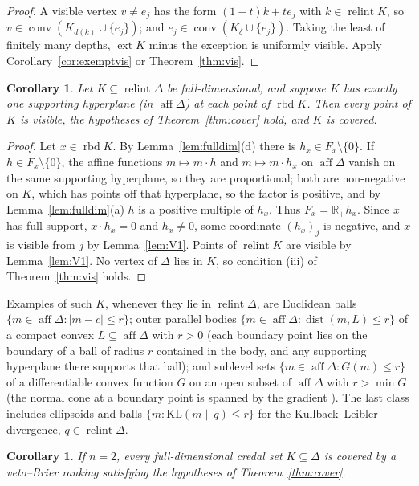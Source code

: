 \documentclass[11pt]{article}
\newcommand{\R}{\mathbb{R}}
\DeclareMathOperator{\conv}{conv}
\DeclareMathOperator{\relint}{relint}
\DeclareMathOperator{\rbd}{rbd}
\DeclareMathOperator{\aff}{aff}
\DeclareMathOperator{\ext}{ext}
\theoremstyle{plain}
\newtheorem{corollary}[theorem]{Corollary}
\theoremstyle{definition}
\theoremstyle{remark}
\begin{document}
\begin{proof}
A visible vertex $v\neq e_j$ has the form $(1-t)k+te_j$ with $k\in\relint K$, so
$v\in\conv(K_{d(k)}\cup\{e_j\})$; and $e_j\in\conv(K_\delta\cup\{e_j\})$. Taking the least
of finitely many depths, $\ext K$ minus the exception is uniformly visible. Apply
Corollary~\ref{cor:exemptvis} or Theorem~\ref{thm:vis}.
\end{proof}

\begin{corollary}\label{cor:smooth}
Let $K\subseteq\relint\Delta$ be full-dimensional, and suppose $K$ has exactly one
supporting hyperplane (in $\aff\Delta$) at each point of $\rbd K$. Then every point of $K$
is visible, the hypotheses of Theorem~\ref{thm:cover} hold, and $K$ is covered.
\end{corollary}

\begin{proof}
Let $x\in\rbd K$. By Lemma~\ref{lem:fulldim}(d) there is $h_x\in F_x\setminus\{0\}$. If
$h\in F_x\setminus\{0\}$, the affine functions $m\mapsto m\cdot h$ and $m\mapsto m\cdot
h_x$ on $\aff\Delta$ vanish on the same supporting hyperplane, so they are proportional;
both are non-negative on $K$, which has points off that hyperplane, so the factor is
positive, and by Lemma~\ref{lem:fulldim}(a) $h$ is a positive multiple of $h_x$. Thus
$F_x=\R_+h_x$. Since $x$ has full support, $x\cdot h_x=0$ and $h_x\neq0$, some coordinate
$(h_x)_j$ is negative, and $x$ is visible from $j$ by Lemma~\ref{lem:V1}. Points of
$\relint K$ are visible by Lemma~\ref{lem:V1}. No vertex of $\Delta$ lies in $K$, so
condition (iii) of Theorem~\ref{thm:vis} holds.
\end{proof}

Examples of such $K$, whenever they lie in $\relint\Delta$, are Euclidean balls
$\{m\in\aff\Delta:|m-c|\le r\}$; outer parallel bodies $\{m\in\aff\Delta:\operatorname{dist}
(m,L)\le r\}$ of a compact convex $L\subseteq\aff\Delta$ with $r>0$ (each boundary point
lies on the boundary of a ball of radius $r$ contained in the body, and any supporting
hyperplane there supports that ball); and sublevel sets $\{m\in\aff\Delta:G(m)\le r\}$ of
a differentiable convex function $G$ on an open subset of $\aff\Delta$ with $r>\min G$
(the normal cone at a boundary point is spanned by the gradient \cite[Cor.~23.7.1]
{Rockafellar}). The last class includes ellipsoids and balls $\{m:\mathrm{KL}(m\|q)\le r\}$
for the Kullback--Leibler divergence, $q\in\relint\Delta$.

\begin{corollary}\label{cor:n2}
If $n=2$, every full-dimensional credal set $K\subseteq\Delta$ is covered by a
veto--Brier ranking satisfying the hypotheses of Theorem~\ref{thm:cover}.
\end{corollary}
\end{document}
